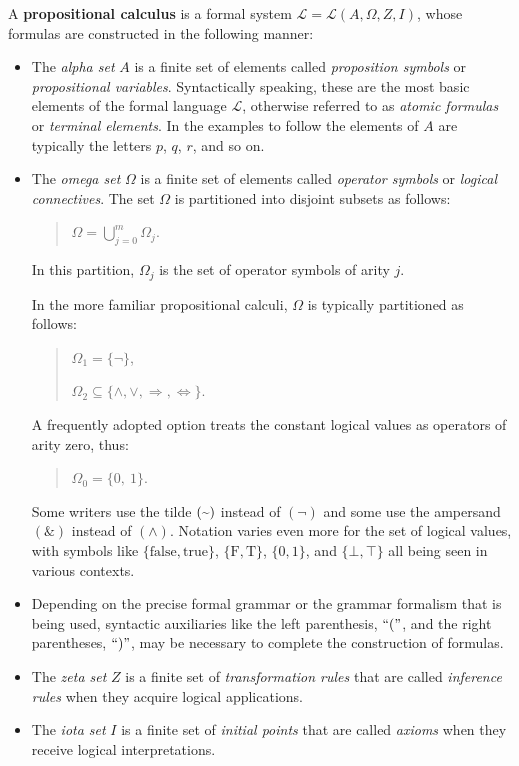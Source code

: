 \documentclass[12pt]{article}
\begin{document}
A \textbf{propositional calculus} is a formal system $\mathcal{L} = \mathcal{L}(A, \Omega, Z, I)$, whose formulas are constructed in the following manner:

\begin{itemize}

\item
The \textit{alpha set} $A$ is a finite set of elements called \textit{proposition symbols} or \textit{propositional variables}.  Syntactically speaking, these are the most basic elements of the formal language $\mathcal{L}$, otherwise referred to as \textit{atomic formulas} or \textit{terminal elements}.  In the examples to follow the elements of $A$ are typically the letters $p$, $q$, $r$, and so on.

\item
The \textit{omega set} $\Omega$ is a finite set of elements called \textit{operator symbols} or \textit{logical connectives}.  The set $\Omega$ is partitioned into disjoint subsets as follows:

\begin{quote}
$\Omega = \bigcup_{j=0}^m \Omega_j$.
\end{quote}

In this partition, $\Omega_j$ is the set of operator symbols of arity $j$.

In the more familiar propositional calculi, $\Omega$ is typically partitioned as follows:

\begin{quote}
$\Omega_1 = \{ \lnot \}$,

$\Omega_2 \subseteq \{ \land, \lor, \Rightarrow, \Leftrightarrow \}$.
\end{quote}

A frequently adopted option treats the constant logical values as operators of arity zero, thus:

\begin{quote}
$\Omega_0 = \{0,\ 1 \}$.
\end{quote}

Some writers use the tilde $(\text{\char126})$ instead of $(\lnot)$ and some use the ampersand $(\&)$ instead of $(\land)$.  Notation varies even more for the set of logical values, with symbols like  $\{ \mathrm{false}, \mathrm{true} \}$, $\{ \mathrm{F}, \mathrm{T} \}$, $\{ 0, 1 \}$, and $\{ \bot, \top \}$ all being seen in various contexts.

\item
Depending on the precise formal grammar or the grammar formalism that is being used, syntactic auxiliaries like the left parenthesis, $``("$, and the right parentheses, $``)"$, may be necessary to complete the construction of formulas.

\item
The \textit{zeta set} $Z$ is a finite set of \textit{transformation rules} that are called \textit{inference rules} when they acquire logical applications.

\item
The \textit{iota set} $I$ is a finite set of \textit{initial points} that are called \textit{axioms} when they receive logical interpretations.
\end{itemize}
\end{document}
